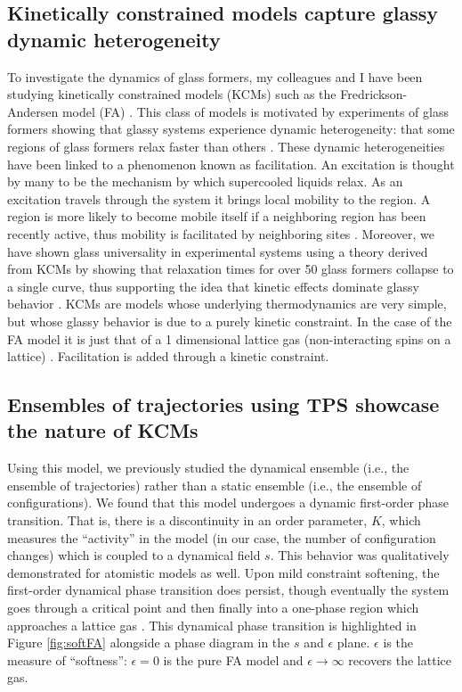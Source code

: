 \documentclass[11pt]{article}
\begin{document}
\subsection*{Kinetically constrained models capture glassy dynamic heterogeneity}
To investigate the dynamics of glass formers, my colleagues and I have been studying kinetically constrained models (KCMs) such as the Fredrickson-Andersen model (FA) \cite{Fredrickson_PhysRevLet_Sept_1984} .  This class of models is motivated by experiments of glass formers showing that glassy systems experience dynamic heterogeneity: that some regions of glass formers relax faster than others \cite{Ediger1996, Angell_Science_1995}.  These dynamic heterogeneities have been linked to a phenomenon known as facilitation. An excitation is thought by many to be the mechanism by which supercooled liquids relax. As an excitation travels through the system it brings local mobility to the region.  A region is more likely to become mobile itself if a neighboring region has been recently active, thus mobility is facilitated by neighboring sites \cite{Keys_NatPhys_Apr_2007}.  Moreover, we have shown glass universality in experimental systems using a theory derived from KCMs by showing that relaxation times for over 50 glass formers collapse to a single curve, thus supporting the idea that kinetic effects dominate glassy behavior \cite{Elmatad2009}. KCMs are models whose underlying thermodynamics are very simple, but whose glassy behavior is due to a purely kinetic constraint.  In the case of the FA model it is just that of a 1 dimensional lattice gas (non-interacting spins on a lattice) \cite{IMSM}. Facilitation is added through a kinetic constraint.

\subsection*{Ensembles of trajectories using TPS showcase the nature of KCMs}
Using this model, we previously studied the dynamical ensemble (i.e., the ensemble of trajectories) rather than a static ensemble (i.e., the ensemble of configurations).  We found that this model undergoes a dynamic first-order phase transition. That is, there is a discontinuity in an order parameter, $K$, which measures the ``activity'' in the model (in our case, the number of configuration changes) which is coupled to a dynamical field $s$.  This behavior was qualitatively demonstrated for atomistic models \cite{Hedges_Science_2009} as well.  Upon mild constraint softening, the first-order dynamical phase transition does persist, though eventually the system goes through a critical point and then finally into a one-phase region which approaches a lattice gas \cite{Elmatad_PNAS_2010}.  This dynamical phase transition is highlighted in Figure \ref{fig:softFA} alongside a phase diagram in the $s$ and $\epsilon$ plane. $\epsilon$ is the measure of ``softness'': $\epsilon=0$ is the pure FA model and $\epsilon \rightarrow \infty$ recovers the lattice gas. 
\end{document}

